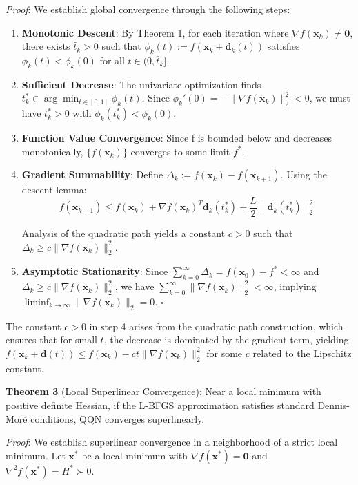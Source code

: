\emph{Proof}: We establish global convergence through the following steps:

\begin{enumerate}
\def\labelenumi{\arabic{enumi}.}
\item
  \textbf{Monotonic Descent}: By Theorem 1, for each iteration where \(\nabla f(\mathbf{x}_k) \neq \mathbf{0}\), there exists \(\bar{t}_k > 0\) such that \(\phi_k(t) := f(\mathbf{x}_k + \mathbf{d}_k(t))\) satisfies \(\phi_k(t) < \phi_k(0)\) for all \(t \in (0, \bar{t}_k]\).
\item
  \textbf{Sufficient Decrease}: The univariate optimization finds \(t_k^* \in \arg\min_{t \in [0,1]} \phi_k(t)\).
  Since \(\phi_k'(0) = -\|\nabla f(\mathbf{x}_k)\|_2^2 < 0\), we must have \(t_k^* > 0\) with \(\phi_k(t_k^*) < \phi_k(0)\).
\item
  \textbf{Function Value Convergence}: Since f is bounded below and decreases monotonically, \(\{f(\mathbf{x}_k)\}\) converges to some limit \(f^*\).
\item
  \textbf{Gradient Summability}: Define \(\Delta_k := f(\mathbf{x}_k) - f(\mathbf{x}_{k+1})\). Using the descent lemma:
  \[f(\mathbf{x}_{k+1}) \leq f(\mathbf{x}_k) + \nabla f(\mathbf{x}_k)^T \mathbf{d}_k(t_k^*) + \frac{L}{2}\|\mathbf{d}_k(t_k^*)\|_2^2\]

  Analysis of the quadratic path yields a constant \(c > 0\) such that \(\Delta_k \geq c\|\nabla f(\mathbf{x}_k)\|_2^2\).
\item
  \textbf{Asymptotic Stationarity}: Since \(\sum_{k=0}^{\infty} \Delta_k = f(\mathbf{x}_0) - f^* < \infty\) and
  \(\Delta_k \geq c\|\nabla f(\mathbf{x}_k)\|_2^2\), we have \(\sum_{k=0}^{\infty} \|\nabla f(\mathbf{x}_k)\|_2^2 < \infty\),
  implying \(\liminf_{k \to \infty} \|\nabla f(\mathbf{x}_k)\|_2 = 0\). \(\square\)
\end{enumerate}

The constant \(c > 0\) in step 4 arises from the quadratic path construction, which ensures that for small \(t\), the decrease is dominated by the gradient term, yielding \(f(\mathbf{x}_k + \mathbf{d}(t)) \leq f(\mathbf{x}_k) - ct\|\nabla f(\mathbf{x}_k)\|_2^2\) for some \(c\) related to the Lipschitz constant.

\textbf{Theorem 3} (Local Superlinear Convergence): Near a local minimum with positive definite Hessian, if the L-BFGS approximation satisfies standard Dennis-Moré conditions, QQN converges superlinearly.

\emph{Proof}: We establish superlinear convergence in a neighborhood of a strict local minimum. Let \(\mathbf{x}^*\) be a local minimum with \(\nabla f(\mathbf{x}^*) = \mathbf{0}\) and \(\nabla^2 f(\mathbf{x}^*) = H^* \succ 0\).

